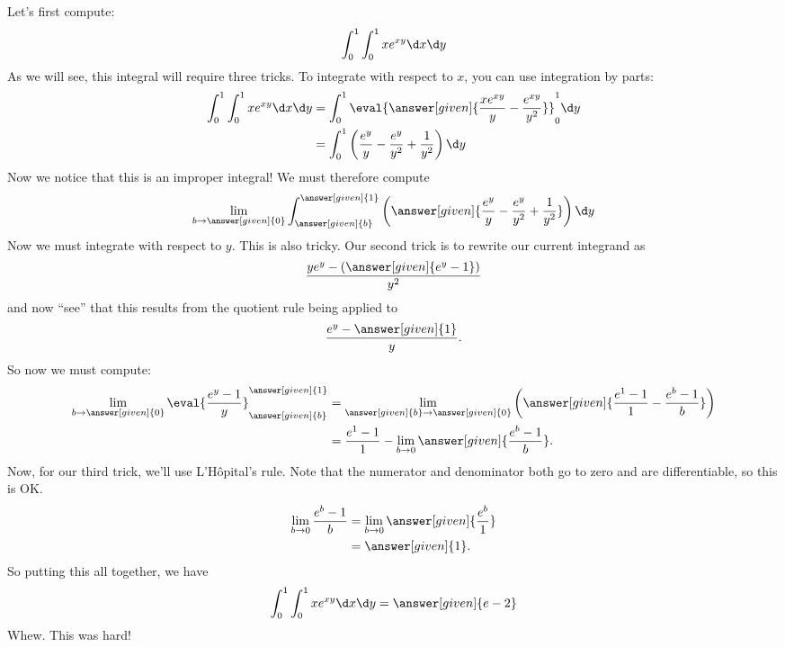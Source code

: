 \documentclass{ximera}
\begin{document}
\begin{example}
\begin{image}
  \end{image}
  \begin{explanation}
    Let's first compute:
    \[
    \int_0^1 \int_0^1 x e^{xy} \d x \d y
    \]
    As we will see, this integral will require three tricks. To
    integrate with respect to $x$, you can use integration by parts:
    \begin{align*}
      \int_0^1 \int_0^1 x e^{xy} \d x \d y &= \int_0^1 \eval{\answer[given]{\frac{xe^{xy}}{y}-\frac{e^{xy}}{y^2}}}_0^1\d y\\
      &= \int_0^1 \left(\frac{e^{y}}{y}-\frac{e^y}{y^2} + \frac{1}{y^2}\right)\d y
    \end{align*}
    Now we notice that this is an improper integral!
    We must therefore compute
    \[
    \lim_{b\to\answer[given]{0}}\int_{\answer[given]{b}}^{\answer[given]{1}} \left(\answer[given]{\frac{e^{y}}{y}-\frac{e^y}{y^2} + \frac{1}{y^2}}\right)\d y
    \]
    Now we must integrate with respect to $y$. This is also
    tricky. Our second trick is to rewrite our current integrand as
    \[
    \frac{y e^y - \left(\answer[given]{e^y -1}\right)}{y^2}
    \]
    and now ``see'' that this results from the quotient rule being
    applied to
    \[
    \frac{e^y-\answer[given]{1}}{y}.
    \]
    So now we must compute:
    \begin{align*}
      \lim_{b\to \answer[given]{0}}\eval{\frac{e^y-1}{y}}_{\answer[given]{b}}^{\answer[given]{1}} &= \lim_{\answer[given]{b}\to \answer[given]{0}}\left(\answer[given]{\frac{e^1-1}{1}-\frac{e^b-1}{b}}\right)\\
      &= \frac{e^1-1}{1}-\lim_{b\to 0}\answer[given]{\frac{e^b-1}{b}}.
    \end{align*}
    Now, for our third trick, we'll use L'H\^opital's rule. Note that
    the numerator and denominator both go to zero and are
    differentiable, so this is OK.
    \begin{align*}
    \lim_{b\to 0}\frac{e^b-1}{b} &= \lim_{b\to 0}\answer[given]{\frac{e^b}{1}}\\
    &= \answer[given]{1}.
    \end{align*}
    So putting this all together, we have
    \[
    \int_0^1 \int_0^1 x e^{xy} \d x \d y = \answer[given]{e-2}
    \]
    Whew. This was hard!



\end{explanation}
\end{example}
\end{document}
